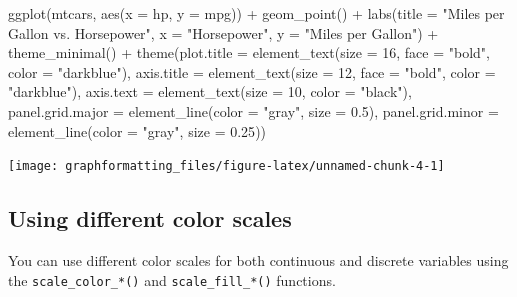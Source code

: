 \documentclass[
]{book}
\newenvironment{Shaded}{\begin{snugshade}}{\end{snugshade}}
\newcommand{\AttributeTok}[1]{\textcolor[rgb]{0.77,0.63,0.00}{#1}}
\newcommand{\DecValTok}[1]{\textcolor[rgb]{0.00,0.00,0.81}{#1}}
\newcommand{\FloatTok}[1]{\textcolor[rgb]{0.00,0.00,0.81}{#1}}
\newcommand{\FunctionTok}[1]{\textcolor[rgb]{0.00,0.00,0.00}{#1}}
\newcommand{\NormalTok}[1]{#1}
\newcommand{\SpecialCharTok}[1]{\textcolor[rgb]{0.00,0.00,0.00}{#1}}
\newcommand{\StringTok}[1]{\textcolor[rgb]{0.31,0.60,0.02}{#1}}
\begin{document}
\begin{Shaded}
\begin{Highlighting}[]
\FunctionTok{ggplot}\NormalTok{(mtcars, }\FunctionTok{aes}\NormalTok{(}\AttributeTok{x =}\NormalTok{ hp, }\AttributeTok{y =}\NormalTok{ mpg)) }\SpecialCharTok{+}
  \FunctionTok{geom\_point}\NormalTok{() }\SpecialCharTok{+}
  \FunctionTok{labs}\NormalTok{(}\AttributeTok{title =} \StringTok{"Miles per Gallon vs. Horsepower"}\NormalTok{,}
       \AttributeTok{x =} \StringTok{"Horsepower"}\NormalTok{,}
       \AttributeTok{y =} \StringTok{"Miles per Gallon"}\NormalTok{) }\SpecialCharTok{+}
  \FunctionTok{theme\_minimal}\NormalTok{() }\SpecialCharTok{+}
  \FunctionTok{theme}\NormalTok{(}\AttributeTok{plot.title =} \FunctionTok{element\_text}\NormalTok{(}\AttributeTok{size =} \DecValTok{16}\NormalTok{, }\AttributeTok{face =} \StringTok{"bold"}\NormalTok{, }\AttributeTok{color =} \StringTok{"darkblue"}\NormalTok{),}
        \AttributeTok{axis.title =} \FunctionTok{element\_text}\NormalTok{(}\AttributeTok{size =} \DecValTok{12}\NormalTok{, }\AttributeTok{face =} \StringTok{"bold"}\NormalTok{, }\AttributeTok{color =} \StringTok{"darkblue"}\NormalTok{),}
        \AttributeTok{axis.text =} \FunctionTok{element\_text}\NormalTok{(}\AttributeTok{size =} \DecValTok{10}\NormalTok{, }\AttributeTok{color =} \StringTok{"black"}\NormalTok{),}
        \AttributeTok{panel.grid.major =} \FunctionTok{element\_line}\NormalTok{(}\AttributeTok{color =} \StringTok{"gray"}\NormalTok{, }\AttributeTok{size =} \FloatTok{0.5}\NormalTok{),}
        \AttributeTok{panel.grid.minor =} \FunctionTok{element\_line}\NormalTok{(}\AttributeTok{color =} \StringTok{"gray"}\NormalTok{, }\AttributeTok{size =} \FloatTok{0.25}\NormalTok{))}
\end{Highlighting}
\end{Shaded}

\texttt{[image: graphformatting\_files/figure-latex/unnamed-chunk-4-1]}

\hypertarget{using-different-color-scales}{%
\subsection{Using different color scales}\label{using-different-color-scales}}

You can use different color scales for both continuous and discrete variables using the \texttt{scale\_color\_*()} and \texttt{scale\_fill\_*()} functions.
\end{document}

